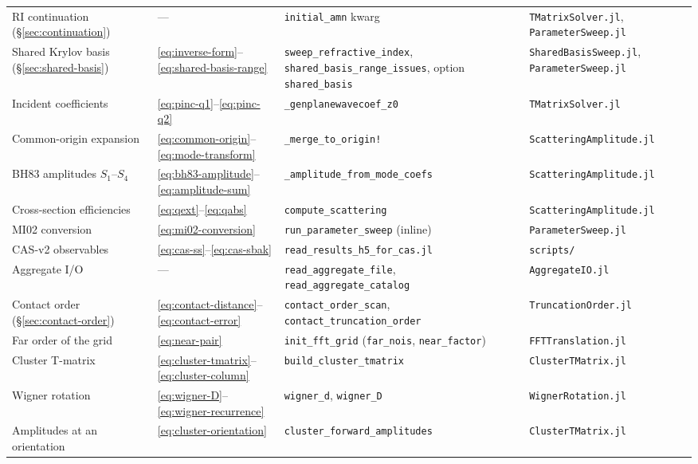 \documentclass[11pt,a4paper]{article}
\begin{document}
\begin{center}
\begin{tabular}{@{} >{\raggedright\arraybackslash}p{3.5cm} >{\raggedright\arraybackslash}p{2.9cm} >{\raggedright\arraybackslash}p{4.7cm} >{\raggedright\arraybackslash}p{4.4cm} @{}}
  RI continuation (\S\ref{sec:continuation}) & --- & \texttt{initial\_amn} kwarg & \texttt{TMatrixSolver.jl}, \texttt{ParameterSweep.jl} \\
  Shared Krylov basis (\S\ref{sec:shared-basis}) & \eqref{eq:inverse-form}--\eqref{eq:shared-basis-range} & \texttt{sweep\_refractive\_index}, \texttt{shared\_basis\_range\_issues}, option \texttt{shared\_basis} & \texttt{SharedBasisSweep.jl}, \texttt{ParameterSweep.jl} \\
  Incident coefficients & \eqref{eq:pinc-q1}--\eqref{eq:pinc-q2} & \texttt{\_genplanewavecoef\_z0} & \texttt{TMatrixSolver.jl} \\
  Common-origin expansion & \eqref{eq:common-origin}--\eqref{eq:mode-transform} & \texttt{\_merge\_to\_origin!} & \texttt{ScatteringAmplitude.jl} \\
  BH83 amplitudes $S_1$--$S_4$ & \eqref{eq:bh83-amplitude}--\eqref{eq:amplitude-sum} & \texttt{\_amplitude\_from\_mode\_coefs} & \texttt{ScatteringAmplitude.jl} \\
  Cross-section efficiencies & \eqref{eq:qext}--\eqref{eq:qabs} & \texttt{compute\_scattering} & \texttt{ScatteringAmplitude.jl} \\
  MI02 conversion & \eqref{eq:mi02-conversion} & \texttt{run\_parameter\_sweep} (inline) & \texttt{ParameterSweep.jl} \\
  CAS-v2 observables & \eqref{eq:cas-ss}--\eqref{eq:cas-sbak} & \texttt{read\_results\_h5\_for\_cas.jl} & \texttt{scripts/} \\
  Aggregate I/O & --- & \texttt{read\_aggregate\_file}, \texttt{read\_aggregate\_catalog} & \texttt{AggregateIO.jl} \\
  Contact order (\S\ref{sec:contact-order}) & \eqref{eq:contact-distance}--\eqref{eq:contact-error} & \texttt{contact\_order\_scan}, \texttt{contact\_truncation\_order} & \texttt{TruncationOrder.jl} \\
  Far order of the grid & \eqref{eq:near-pair} & \texttt{init\_fft\_grid} (\texttt{far\_nois}, \texttt{near\_factor}) & \texttt{FFTTranslation.jl} \\
  Cluster T-matrix & \eqref{eq:cluster-tmatrix}--\eqref{eq:cluster-column} & \texttt{build\_cluster\_tmatrix} & \texttt{ClusterTMatrix.jl} \\
  Wigner rotation & \eqref{eq:wigner-D}--\eqref{eq:wigner-recurrence} & \texttt{wigner\_d}, \texttt{wigner\_D} & \texttt{WignerRotation.jl} \\
  Amplitudes at an orientation & \eqref{eq:cluster-orientation} & \texttt{cluster\_forward\_amplitudes} & \texttt{ClusterTMatrix.jl} \\

\end{tabular}
\end{center}
\end{document}
